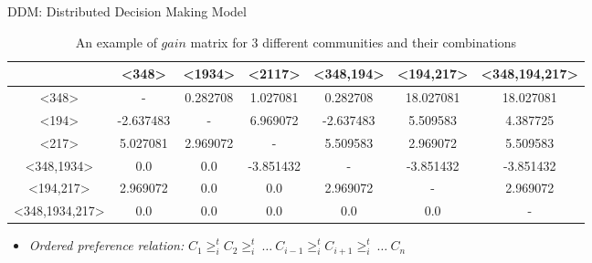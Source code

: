\documentclass{beamer}
\begin{document}
\begin{frame}{DDM: Distributed Decision Making Model}
    \begin{table}[ht]
        \tiny
        \caption{An example of $gain$ matrix for 3 different communities and their combinations} %
        \centering %
        {\renewcommand{\arraystretch}{1.2}
        \begin{tabular}{c|c c c c c c} %
        \hline\hline %
         & \textless348\textgreater & \textless1934\textgreater & \textless2117\textgreater & \textless348,194\textgreater & \textless194,217\textgreater & \textless348,194,217\textgreater \\ [0.5ex] %
        \hline %
        \textless348\textgreater & - & 0.282708 & 1.027081 & 0.282708 & 18.027081 & 18.027081 \\
        \textless194\textgreater & -2.637483 & - & 6.969072 & -2.637483 & 5.509583 & 4.387725 \\
        \textless217\textgreater & 5.027081 & 2.969072 & - & 5.509583 & 2.969072 & 5.509583 \\
        \textless348,1934\textgreater & 0.0 & 0.0 & -3.851432 & - & -3.851432 & -3.851432 \\
        \textless194,217\textgreater & 2.969072 & 0.0 & 0.0 & 2.969072 & - & 2.969072 \\
        \textless348,1934,217\textgreater & 0.0 & 0.0 & 0.0 & 0.0 & 0.0 & - \\ [1ex] %
        \hline %
        \end{tabular}
        }
        \label{table:nonlin} %
    \end{table}
        
    \footnotesize
    \begin{itemize}
        \item \emph{Ordered preference relation:} $C_1 \geq_{i}^t C_2 \geq_{i}^t ~\dots~ C_{i-1} \geq_{i}^t C_{i+1} \geq_{i}^t ~\dots~ C_n$    
    \end{itemize}
    
\end{frame}
\end{document}
